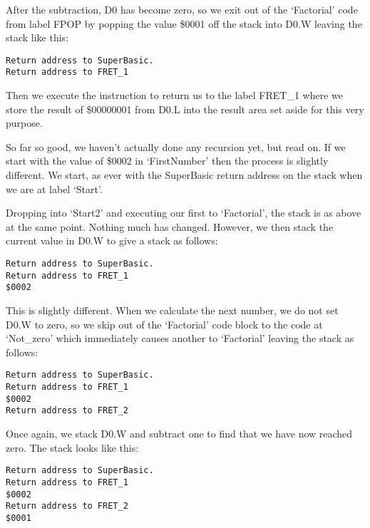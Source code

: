 After the subtraction, D0 has become zero, so we exit out of the
      `Factorial' code from label FPOP by popping the value \$0001 off the
      stack into D0.W leaving the stack like this:

\begin{lstlisting}[firstnumber=1,frame=none,numbers=none]
Return address to SuperBasic.
Return address to FRET_1
\end{lstlisting}

Then we execute the  instruction to return us to the label
      FRET\_1 where we store the result of \$00000001 from D0.L into the result
      area set aside for this very purpose.

So far so good, we haven't actually done any recursion yet, but
      read on. If we start with the value of \$0002 in `FirstNumber' then the
      process is slightly different. We start, as ever with the SuperBasic
      return address on the stack when we are at label `Start'.

Dropping into `Start2' and executing our first  to `Factorial',
      the stack is as above at the same point. Nothing much has changed.
      However, we then stack the current value in D0.W to give a stack as
      follows:

\begin{lstlisting}[firstnumber=1,frame=none,numbers=none]
Return address to SuperBasic.
Return address to FRET_1
$0002
\end{lstlisting}

This is slightly different. When we calculate the next number, we
      do not set D0.W to zero, so we skip out of the `Factorial' code block to
      the code at `Not\_zero' which immediately causes another  to
      `Factorial' leaving the stack as follows:

\begin{lstlisting}[firstnumber=1,frame=none,numbers=none]
Return address to SuperBasic.
Return address to FRET_1
$0002
Return address to FRET_2
\end{lstlisting}

Once again, we stack D0.W and subtract one to find that we have
      now reached zero. The stack looks like this:

\begin{lstlisting}[firstnumber=1,frame=none,numbers=none]
Return address to SuperBasic.
Return address to FRET_1
$0002
Return address to FRET_2
$0001
\end{lstlisting}

